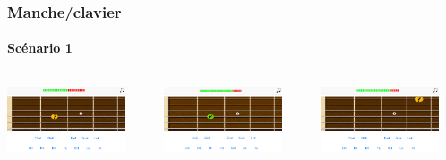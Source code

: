 \documentclass{beamer}
\begin{document}
	\begin{frame}

   		\frametitle{Manche/clavier}

       		\framesubtitle{Scénario 1}

	\begin{columns}

	 	\begin{column}{0.33\textwidth}

		\includegraphics[width=3.5cm]{images/clavier_question.png}

		\end{column}

	 \begin{column}{0.33\textwidth}

		\includegraphics[width=3.5cm]{images/clavier_bonne.png}

	\end{column}

	 \begin{column}{0.33\textwidth}

		\includegraphics[width=3.5cm]{images/clavier_bonne_reponse_nouvelle_question.png}

	\end{column}

	\end{columns} 

	\end{frame}



\end{document}

